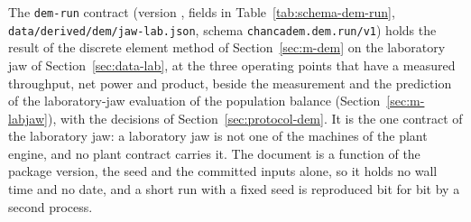 The \texttt{dem-run} contract (version , fields in Table~\ref{tab:schema-dem-run}, \texttt{data/\allowbreak{}derived/\allowbreak{}dem/\allowbreak{}jaw-lab.json}, schema \texttt{chancadem.dem.run/\allowbreak{}v1}) holds the result of the discrete element method of Section~\ref{sec:m-dem} on the laboratory jaw of Section~\ref{sec:data-lab}, at the three operating points that have a measured throughput, net power and product, beside the measurement and the prediction of the laboratory-jaw evaluation of the population balance (Section~\ref{sec:m-labjaw}), with the decisions of Section~\ref{sec:protocol-dem}. It is the one contract of the laboratory jaw: a laboratory jaw is not one of the machines of the plant engine, and no plant contract carries it. The document is a function of the package version, the seed and the committed inputs alone, so it holds no wall time and no date, and a short run with a fixed seed is reproduced bit for bit by a second process.

